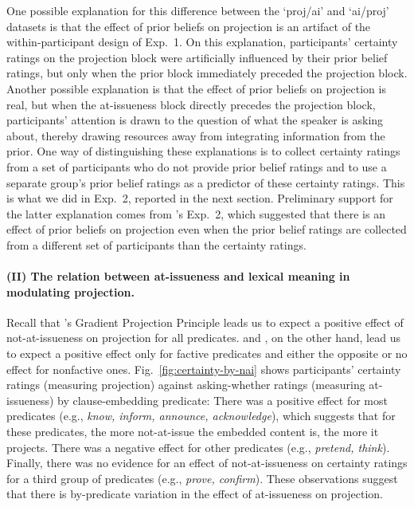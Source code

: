 \documentclass[11pt,fleqn]{article}
\newcommand{\6}{\mbox{$[\hspace*{-.6mm}[$}}
\newcommand{\9}{\mbox{$]\hspace*{-.6mm}]$}}
\newcommand{\citepos}[1]{\citeauthor{#1}'s \citeyear{#1}}
\begin{document}
One possible explanation for this difference between the `proj/ai' and `ai/proj' datasets is that the effect of prior beliefs on projection is an artifact of the within-participant design of Exp.~1. On this explanation, participants' certainty ratings on the projection block were artificially influenced by their prior belief ratings, but only when the prior block immediately preceded the projection block. Another possible explanation is that the effect of prior beliefs on projection is real, but when the at-issueness block directly precedes the projection block, participants' attention is drawn to the question of what the speaker is asking about, thereby drawing resources away from integrating information from the prior. One way of distinguishing these explanations is to collect certainty ratings from a set of participants who do not provide prior belief ratings and to use a separate group's prior belief ratings as a predictor of these certainty ratings. This is what we did in Exp.~2,  reported in the next section. Preliminary support for the latter explanation comes from \citepos{degen-tonhauser-openmind} Exp.~2, which suggested that there is an effect of prior beliefs on projection even when the prior belief ratings are collected from a different set of participants than the certainty ratings.
                          
\paragraph{(II) The relation between at-issueness and lexical meaning in modulating projection.} Recall that \citepos{tbd-variability} Gradient Projection Principle leads us to expect a positive effect of not-at-issueness on projection for all predicates. \citealt{djaerv-bacovcin-salt27,djaerv-bacovcin2020} and \citealt{mahler-etal2020}, on the other hand, lead us to expect a positive effect only for factive predicates and either the opposite or no effect for nonfactive ones. Fig.~\ref{fig:certainty-by-nai} shows participants' certainty ratings (measuring projection) against asking-whether ratings (measuring at-issueness) by clause-embedding predicate: There was a positive effect for most predicates (e.g., {\em know, inform, announce, acknowledge}), which suggests that for these predicates, the more not-at-issue the embedded content is, the more it projects. There was a negative effect for other predicates (e.g., {\em pretend, think}). Finally, there was no evidence for an effect of not-at-issueness on certainty ratings for a third group of predicates (e.g., {\em prove, confirm}). These observations suggest that there is by-predicate variation in the effect of at-issueness on projection.
\end{document}
